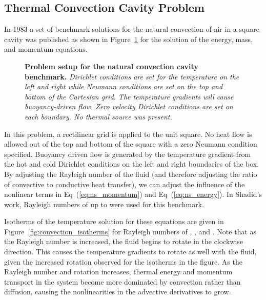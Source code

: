 \subsection{Thermal Convection Cavity Problem}
\label{subsec:natural_convection_cavity}
In 1983 a set of benchmark solutions for the natural convection of air
in a square cavity was published \cite{de_vahl_davis_natural_1983} as
shown in Figure~\ref{fig:natural_convection_cavity} for the solution
of the energy, mass, and momentum equations.
\begin{figure}[t!]
  \begin{center}
    \scalebox{1.5}{
       }
  \end{center}
  \caption{\textbf{Problem setup for the natural convection cavity
      benchmark.} \textit{Dirichlet conditions are set for the
      temperature on the left and right while Neumann conditions are
      set on the top and bottom of the Cartesian grid. The temperature
      gradients will cause buoyancy-driven flow. Zero velocity
      Dirichlet conditions are set on each boundary. No thermal source
      was present.}}
  \label{fig:natural_convection_cavity}
\end{figure}
In this problem, a rectilinear grid is applied to the unit square. No
heat flow is allowed out of the top and bottom of the square with a
zero Neumann condition specified. Buoyancy driven flow is generated by
the temperature gradient from the hot and cold Dirichlet conditions on
the left and right boundaries of the box. By adjusting the Rayleigh
number of the fluid (and therefore adjusting the ratio of convective
to conductive heat transfer), we can adjust the influence of the
nonlinear terms in Eq~(\ref{eq:ns_momentum}) and
Eq~(\ref{eq:ns_energy}). In Shadid's work, Rayleigh numbers of up to
 were used for this benchmark.

Isotherms of the temperature solution for these equations are given in
Figure~\ref{fig:convection_isotherms} for Rayleigh numbers of
, ,  and . Note that as the
Rayleigh number is increased, the fluid begins to rotate in the
clockwise direction. This causes the temperature gradients to rotate
as well with the fluid, given the increased rotation observed for the
isotherms in the figure. As the Rayleigh number and rotation
increases, thermal energy and momentum transport in the system become
more dominated by convection rather than diffusion, causing the
nonlinearities in the advective derivatives to grow.


